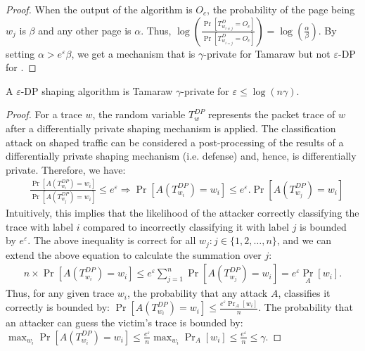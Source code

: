 {\begin{proof}
When the output of the algorithm is $O_{c}$, the probability of the page being
$w_j$ is $\beta$ and any other page is $\alpha$. Thus,
$\log(\frac{\Pr[T_{w_{i\neq j}}^{D}=O_{c}]}{\Pr[T_{w_{i=j}}^{D}=O_{c}]})
= \log(\frac{\alpha}{\beta})$.
By setting $\alpha > {e^{\varepsilon}}\beta$, we get a mechanism that is
$\gamma$-private for Tamaraw but not $\varepsilon$-DP for {\sys}.
\vspace{-0.2cm}
\end{proof}
\begin{lemma}
  A $\varepsilon$-DP shaping algorithm is Tamaraw $\gamma$-private for
  $\varepsilon \leq \log(n\gamma)$.
\end{lemma}
\begin{proof}
For a trace $w$, the random variable $T_{w}^{DP}$ represents the packet
trace of $w$ after a differentially private shaping mechanism is applied.
%
The classification attack on shaped traffic can
be considered a post-processing of the results of a
differentially private shaping mechanism (i.e. defense) and, hence, is
differentially
private. Therefore, we have:
\begin{align*}
& \frac{\Pr[A(T_{w_{i}}^{DP}) = w_i]}{\Pr[A(T_{w_{j}}^{DP}) = w_i]} \leq e^
{\varepsilon}
\Rightarrow \Pr[A(T_{w_{i}}^{DP}) = w_i] \leq e^
{\varepsilon} .\Pr[A(T_{w_{j}}^{DP}) = w_i]
\end{align*}
Intuitively, this implies that the likelihood of the attacker correctly
classifying the trace with label $i$ compared to incorrectly classifying it with
label $j$ is bounded by $e^{\varepsilon}$.
The above inequality is correct for all $w_j: j\in \{1, 2, \dots, n\}$, and we
can extend the above equation to calculate the summation over $j$:
\vspace{-0.3cm}
\begin{align*}
n\times \Pr[A(T_{w_{i}}^{DP}) = w_i] \leq e^{\varepsilon}\sum_{j=1}^{n}
\Pr[A(T_{w_{j}}^{DP}) = w_i]
= e^{\varepsilon} \operatorname{Pr}_{A}[w_i].
\end{align*}
Thus, for any given trace $w_i$, the probability that any attack $A$,
classifies it correctly is bounded by:
$\Pr[A(T_{w_{i}}^{DP}) = w_i] \leq \frac{e^{\varepsilon} \Pr_{A}[w_i]}{n}$.
The probability that an attacker can guess the victim’s trace is bounded by:
$\max_{w_i}{\Pr[A(T_{w_{i}}^{DP}) = w_i]} \leq \frac{e^{\varepsilon}}{n}
\max_{w_i}{\operatorname{Pr}_{A}[w_i]} \leq \frac{e^{\varepsilon}}{n} \leq
\gamma$.
\end{proof}
}
